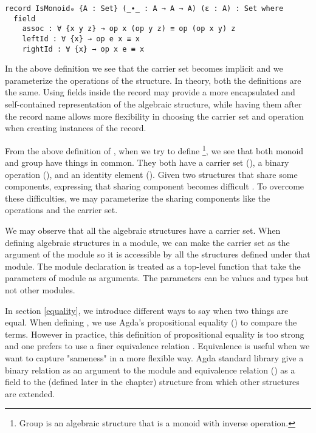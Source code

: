 \begin{verbatim}
record IsMonoid₀ {A : Set} (_∙_ : A → A → A) (ε : A) : Set where
  field
    assoc : ∀ {x y z} → op x (op y z) ≡ op (op x y) z
    leftId : ∀ {x} → op e x ≡ x
    rightId : ∀ {x} → op x e ≡ x 
\end{verbatim}

In the above definition we see that the carrier set  becomes implicit
and we parameterize the operations of the structure. In theory, both the
definitions are the same. Using fields inside the record may provide a more
encapsulated and self-contained representation of the algebraic structure, while
having them after the record name allows more flexibility in choosing the
carrier set and operation when creating instances of the record. 

From the above definition of , when we try to define
\footnote{Group is an algebraic structure that is a monoid with
inverse operation.}, we see that both monoid and group have things in common.
They both have a carrier set (), a binary operation (), and
an identity element (). Given two structures that share some
components, expressing that sharing component becomes difficult \cite{musa}. To
overcome these difficulties, we may parameterize the sharing components like the
operations and the carrier set.

We may observe that all the algebraic structures have a carrier set. When
defining algebraic structures in a module, we can make the carrier set as the
argument of the module so it is accessible by all the structures defined under
that module. The module declaration is treated as a top-level function that take
the parameters of module as arguments. The parameters can be values and types
but not other modules.

In section \ref{equality}, we introduce different ways to say when two things
are equal. When defining , we use Agda's propositional equality
() to compare the terms. However in practice, this definition of
propositional equality is too strong and one prefers to use a finer equivalence
relation \cite{musa}. Equivalence is useful when we want to capture "sameness"
in a more flexible way. Agda standard library give a binary relation as an
argument to the module and equivalence relation () as a
field to the  (defined later in the chapter) structure from
which other structures are extended.
 
